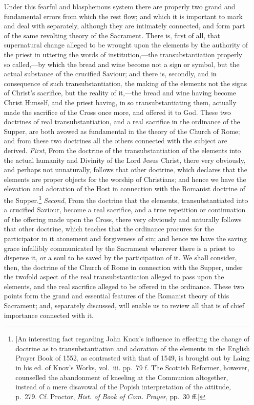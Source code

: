 \documentclass[english,]{book}
\begin{document}
Under this fearful and blasphemous system there are properly two grand and fundamental errors from which the rest flow; and which it is important to mark and deal with separately, although they are intimately connected, and form part of the same revolting theory of the Sacrament. There is, first of all, that supernatural change alleged to be wrought upon the elements by the authority of the priest in uttering the words of institution,---the transubstantiation properly so called,---by which the bread and wine become not a sign or symbol, but the actual substance of the crucified Saviour; and there is, secondly, and in consequence of such transubstantiation, the making of the elements not the signs of Christ's sacrifice, but the reality of it,---the bread and wine having become Christ Himself, and the priest having, in so transubstantiating them, actually made the sacrifice of the Cross once more, and offered it to God. These two doctrines of real transubstantiation, and a real sacrifice in the ordinance of the Supper, are both avowed as fundamental in the theory of the Church of Rome; and from these two doctrines all the others connected with the subject are derived. \emph{First}, From the doctrine of the transubstantiation of the elements into the actual humanity and Divinity of the Lord Jesus Christ, there very obviously, and perhaps not unnaturally, follows that other doctrine, which declares that the elements are proper objects for the worship of Christians; and hence we have the elevation and adoration of the Host in connection with the Romanist doctrine of the Supper.\footnote{{[}An interesting fact regarding John Knox's influence in effecting the change of doctrine as to transubstantiation and adoration of the elements in the English Prayer Book of 1552, as contrasted with that of 1549, is brought out by Laing in his ed. of Knox's Works, vol.~iii. pp.~79 f. The Scottish Reformer, however, counselled the abandonment of kneeling at the Communion altogether, instead of a mere disavowal of the Popish interpretation of the attitude, p.~279. Cf. Proctor, \emph{Hist. of Book of Com. Prayer}, pp.~30 ff.{]}} \emph{Second}, From the doctrine that the elements, transubstantiated into a crucified Saviour, become a real sacrifice, and a true repetition or continuation of the offering made upon the Cross, there very obviously and naturally follows that other doctrine, which teaches that the ordinance procures for the participator in it atonement and forgiveness of sin; and hence we have the saving grace infallibly communicated by the Sacrament wherever there is a priest to dispense it, or a soul to be saved by the participation of it. We shall consider, then, the doctrine of the Church of Rome in connection with the Supper, under the twofold aspect of the real transubstantiation alleged to pass upon the elements, and the real sacrifice alleged to be offered in the ordinance. These two points form the grand and essential features of the Romanist theory of this Sacrament; and, separately discussed, will enable us to review all that is of chief importance connected with it.
\end{document}
